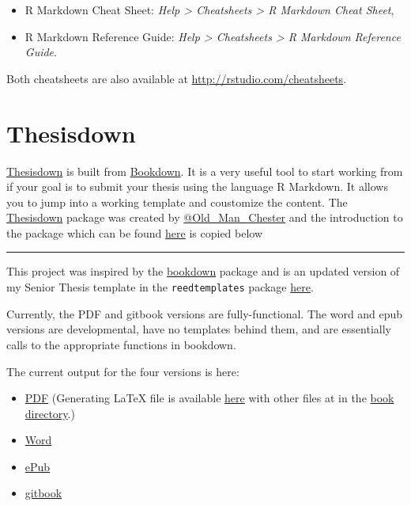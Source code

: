 \documentclass[]{book}
\providecommand{\tightlist}{%
  \setlength{\itemsep}{0pt}\setlength{\parskip}{0pt}}
\theoremstyle{definition}
\theoremstyle{definition}
\theoremstyle{remark}
\begin{document}
\begin{itemize}
\item
  R Markdown Cheat Sheet: \emph{Help \textgreater{} Cheatsheets
  \textgreater{} R Markdown Cheat Sheet},
\item
  R Markdown Reference Guide: \emph{Help \textgreater{} Cheatsheets
  \textgreater{} R Markdown Reference Guide}.
\end{itemize}

Both cheatsheets are also available at
\url{http://rstudio.com/cheatsheets}.

\section{Thesisdown}\label{thesisdown}

\href{https://github.com/ismayc/thesisdown}{Thesisdown} is built from
\href{https://bookdown.org/home/}{Bookdown}. It is a very useful tool to
start working from if your goal is to submit your thesis using the
language R Markdown. It allows you to jump into a working template and
coustomize the content. The
\href{https://github.com/ismayc/thesisdown}{Thesisdown} package was
created by
\href{https://twitter.com/old_man_chester}{@Old\_Man\_Chester} and the
introduction to the package which can be found \href{}{here} is copied
below

\begin{center}\rule{0.5\linewidth}{\linethickness}\end{center}

This project was inspired by the
\href{http://github.com/rstudio/bookdown}{bookdown} package and is an
updated version of my Senior Thesis template in the
\texttt{reedtemplates} package
\href{http://github.com/ismayc/reedtemplates}{here}.

Currently, the PDF and gitbook versions are fully-functional. The word
and epub versions are developmental, have no templates behind them, and
are essentially calls to the appropriate functions in bookdown.

The current output for the four versions is here:

\begin{itemize}
\tightlist
\item
  \href{https://github.com/ismayc/thesisdown_book/blob/gh-pages/thesis.pdf}{PDF}
  (Generating LaTeX file is available
  \href{https://github.com/ismayc/thesisdown_book/blob/gh-pages/thesis.tex}{here}
  with other files at in the
  \href{https://github.com/ismayc/thesisdown_book/tree/gh-pages}{book
  directory}.)
\item
  \href{https://github.com/ismayc/thesisdown_book/blob/gh-pages/thesis.docx}{Word}
\item
  \href{https://github.com/ismayc/thesisdown_book/blob/gh-pages/thesis.epub}{ePub}
\item
  \href{http://ismayc.github.io/thesisdown_book}{gitbook}
\end{itemize}
\end{document}
